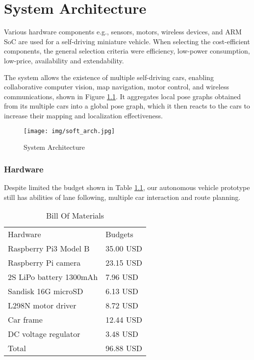 \chapter{System Architecture}
\pagestyle{plain}

\begin{spacing}{2.0}

Various hardware components e.g., sensors, motors, wireless devices, and ARM SoC are used for a self-driving miniature vehicle. When selecting the cost-efficient components, the general
selection criteria were efficiency, low-power consumption, low-price, availability and extendability.

The system allows the existence of multiple self-driving cars, enabling collaborative computer vision, map navigation, motor control, and wireless communications, shown in Figure \ref{fig:overall_arch}. It aggregates local pose graphs obtained from its multiple cars into a global pose graph, which it then reacts to the cars to increase their mapping and localization effectiveness.

\begin{figure}
	\centering
	\texttt{[image: img/soft\_arch.jpg]}
	\caption{System Architecture}
	\label{fig:overall_arch}
\end{figure}

\subsection{Hardware}

Despite limited the budget shown in Table \ref{hardware_list}, our autonomous vehicle prototype still has abilities of lane following, multiple car interaction and route planning.

\begin{table}
	\centering
	\caption{Bill Of Materials}
	\label{hardware_list}
	\begin{tabular}{ll}
		Hardware                & Budgets  \\
		Raspberry Pi3 Model B   & 35.00 USD \\
		Raspberry Pi camera     & 23.15 USD  \\
		2S LiPo battery 1300mAh & 7.96 USD  \\
		Sandisk 16G microSD     & 6.13 USD  \\
		L298N motor driver      & 8.72 USD  \\
		Car frame               & 12.44 USD  \\
		DC voltage regulator    &  3.48 USD  \\
		Total                   & 96.88 USD
	\end{tabular}
\end{table}

\end{spacing}
\clearpage
{}

